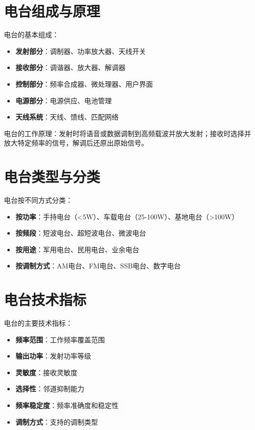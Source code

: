 \section{电台组成与原理}
\label{sec:radio_station_components}

电台的基本组成：

\begin{itemize}
    \item \textbf{发射部分}：调制器、功率放大器、天线开关
    \item \textbf{接收部分}：调谐器、放大器、解调器
    \item \textbf{控制部分}：频率合成器、微处理器、用户界面
    \item \textbf{电源部分}：电源供应、电池管理
    \item \textbf{天线系统}：天线、馈线、匹配网络
\end{itemize}

电台的工作原理：发射时将语音或数据调制到高频载波并放大发射；接收时选择并放大特定频率的信号，解调后还原出原始信号。

\section{电台类型与分类}
\label{sec:radio_station_types}

电台按不同方式分类：

\begin{itemize}
    \item \textbf{按功率}：手持电台（<5W）、车载电台（25-100W）、基地电台（>100W）
    \item \textbf{按频段}：短波电台、超短波电台、微波电台
    \item \textbf{按用途}：军用电台、民用电台、业余电台
    \item \textbf{按调制方式}：AM电台、FM电台、SSB电台、数字电台
\end{itemize}

\section{电台技术指标}
\label{sec:radio_station_specs}

电台的主要技术指标：

\begin{itemize}
    \item \textbf{频率范围}：工作频率覆盖范围
    \item \textbf{输出功率}：发射功率等级
    \item \textbf{灵敏度}：接收灵敏度
    \item \textbf{选择性}：邻道抑制能力
    \item \textbf{频率稳定度}：频率准确度和稳定性
    \item \textbf{调制方式}：支持的调制类型
\end{itemize}

